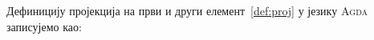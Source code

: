 Дефиницију пројекција на први и други елемент~\ref{def:proj} у језику \textsc{Agda} записујемо као:
\begin{code}%
\>[0]%
\>[663I]\AgdaSymbol{:}\AgdaSpace{}%
\AgdaSymbol{\{}\AgdaSpace{}%
\AgdaSymbol{:}\AgdaSpace{}%
\AgdaSpace{}%
\AgdaSpace{}%
\AgdaSymbol{\}}\AgdaSpace{}%
\AgdaSymbol{\{}\AgdaSpace{}%
\AgdaSymbol{:}\AgdaSpace{}%
\AgdaSpace{}%
\AgdaSpace{}%
\AgdaSpace{}%
\AgdaSpace{}%
\AgdaSymbol{\}}\<%
\\
\>[.][@{}l@{}]\<[663I]%
\>[4]\AgdaSpace{}%
\AgdaSpace{}%
\AgdaSpace{}%
\AgdaSpace{}%
\<%
\\
\>[0]\AgdaSpace{}%
\AgdaSymbol{(}\AgdaSpace{}%
\AgdaOperator{\AgdaInductiveConstructor{,}}\AgdaSpace{}%
\AgdaSymbol{)}\AgdaSpace{}%
\AgdaSymbol{=}\AgdaSpace{}%
\<%
\\
%
\\[\AgdaEmptyExtraSkip]%
\>[0]%
\>[685I]\AgdaSymbol{:}\AgdaSpace{}%
\AgdaSymbol{\{}\AgdaSpace{}%
\AgdaSymbol{:}\AgdaSpace{}%
\AgdaSpace{}%
\AgdaSpace{}%
\AgdaSymbol{\}}\AgdaSpace{}%
\AgdaSymbol{\{}\AgdaSpace{}%
\AgdaSymbol{:}\AgdaSpace{}%
\AgdaSpace{}%
\AgdaSpace{}%
\AgdaSpace{}%
\AgdaSpace{}%
\AgdaSymbol{\}}\<%
\\
\>[.][@{}l@{}]\<[685I]%
\>[4]\AgdaSpace{}%
\AgdaSymbol{(}\AgdaSpace{}%
\AgdaSymbol{:}\AgdaSpace{}%
\AgdaSpace{}%
\AgdaSymbol{)}\AgdaSpace{}%
\AgdaSpace{}%
\AgdaSpace{}%
\AgdaSymbol{(}\AgdaSpace{}%
\AgdaSymbol{)}\<%
\\
\>[0]\AgdaSpace{}%
\AgdaSymbol{(}\AgdaSpace{}%
\AgdaOperator{\AgdaInductiveConstructor{,}}\AgdaSpace{}%
\AgdaSymbol{)}\AgdaSpace{}%
\AgdaSymbol{=}\AgdaSpace{}%
\<%
\end{code}

